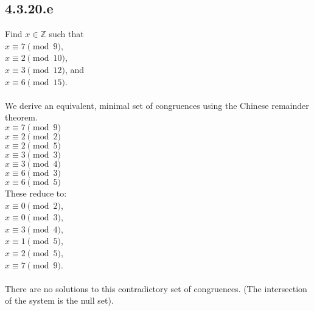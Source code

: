 \documentclass{article}
\begin{document}
\newpage
\subsection{4.3.20.e}
Find $x\in\mathbb{Z}$ such that\
\\$x\equiv7\pmod{9}$,
\\$x\equiv2\pmod{10}$,
\\$x\equiv3\pmod{12}$, and
\\$x\equiv6\pmod{15}$.
\\
\\We derive an equivalent, minimal set of congruences
using the Chinese remainder theorem.
\\$x\equiv7\pmod{9}$
\\$x\equiv2\pmod{2}$
\\$x\equiv2\pmod{5}$
\\$x\equiv3\pmod{3}$
\\$x\equiv3\pmod{4}$
\\$x\equiv6\pmod{3}$
\\$x\equiv6\pmod{5}$
\\These reduce to:
\\$x\equiv0\pmod{2}$,
\\$x\equiv0\pmod{3}$,
\\$x\equiv3\pmod{4}$,
\\$x\equiv1\pmod{5}$,
\\$x\equiv2\pmod{5}$,
\\$x\equiv7\pmod{9}$.
\\
\\There are no solutions to this contradictory set of congruences.
(The intersection of the system is the null set).

\newpage
\end{document}
